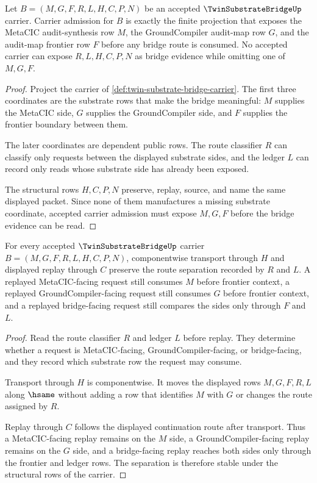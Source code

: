 \begin{theorem}
\label{thm:twin-substrate-bridge-carrier-admission}
Let $B=(M,G,F,R,L,H,C,P,N)$ be an accepted $\TwinSubstrateBridgeUp$ carrier. Carrier admission for $B$ is exactly the finite projection that exposes the MetaCIC audit-synthesis row $M$, the GroundCompiler audit-map row $G$, and the audit-map frontier row $F$ before any bridge route is consumed. No accepted carrier can expose $R,L,H,C,P,N$ as bridge evidence while omitting one of $M,G,F$.
\end{theorem}
\begin{proof}
Project the carrier of \autoref{def:twin-substrate-bridge-carrier}. The first three coordinates are the substrate rows that make the bridge meaningful: $M$ supplies the MetaCIC side, $G$ supplies the GroundCompiler side, and $F$ supplies the frontier boundary between them.

The later coordinates are dependent public rows. The route classifier $R$ can classify only requests between the displayed substrate sides, and the ledger $L$ can record only reads whose substrate side has already been exposed.

The structural rows $H,C,P,N$ preserve, replay, source, and name the same displayed packet. Since none of them manufactures a missing substrate coordinate, accepted carrier admission must expose $M,G,F$ before the bridge evidence can be read.
\end{proof}

\begin{theorem}
\label{thm:twin-substrate-bridge-replay-stability}
For every accepted $\TwinSubstrateBridgeUp$ carrier $B=(M,G,F,R,L,H,C,P,N)$, componentwise transport through $H$ and displayed replay through $C$ preserve the route separation recorded by $R$ and $L$. A replayed MetaCIC-facing request still consumes $M$ before frontier context, a replayed GroundCompiler-facing request still consumes $G$ before frontier context, and a replayed bridge-facing request still compares the sides only through $F$ and $L$.
\end{theorem}
\begin{proof}
Read the route classifier $R$ and ledger $L$ before replay. They determine whether a request is MetaCIC-facing, GroundCompiler-facing, or bridge-facing, and they record which substrate row the request may consume.

Transport through $H$ is componentwise. It moves the displayed rows $M,G,F,R,L$ along $\hsame$ without adding a row that identifies $M$ with $G$ or changes the route assigned by $R$.

Replay through $C$ follows the displayed continuation route after transport. Thus a MetaCIC-facing replay remains on the $M$ side, a GroundCompiler-facing replay remains on the $G$ side, and a bridge-facing replay reaches both sides only through the frontier and ledger rows. The separation is therefore stable under the structural rows of the carrier.
\end{proof}

